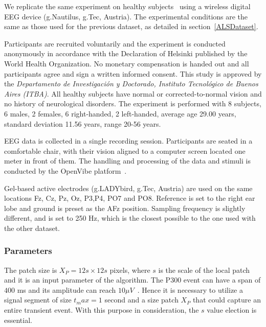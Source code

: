 \documentclass[utf8]{frontiersSCNS} %
\begin{document}
We replicate the same experiment on healthy subjects~\citep{owndataset} using a wireless digital EEG device (g.Nautilus, g.Tec, Austria).  The experimental conditions are the same as those used for the previous dataset, as detailed in section~\ref{ALSDataset}.

Participants are recruited voluntarily and the experiment is conducted anonymously in accordance with the Declaration of Helsinki published by the World Health Organization.  No monetary compensation is handed out and all participants agree and sign a written informed consent.  This study is approved by the \textit{Departamento de Investigación y Doctorado, Instituto Tecnológico de Buenos Aires (ITBA)}.  All healthy subjects have normal or corrected-to-normal vision and no history of neurological disorders. The experiment is performed with 8 subjects, 6 males, 2 females, 6 right-handed, 2 left-handed, average age 29.00 years, standard deviation  11.56 years, range 20-56 years.

EEG data is collected in a single recording session. Participants are seated in a comfortable chair, with their vision aligned to a computer screen located one meter in front of them.  The handling and processing of the data and stimuli is conducted by the OpenVibe platform~\citep{Renard2010}. 

Gel-based active electrodes (g.LADYbird, g.Tec, Austria) are used on the same locations Fz, Cz, Pz, Oz, P3,P4, PO7 and PO8.  Reference is set to the right ear lobe and ground is preset as the AFz position.   Sampling frequency is slightly different, and is set to 250 Hz, which is the closest possible to the one used with the other dataset.



\subsubsection{Parameters}

The patch size is $X_P = 12s \times 12s$ pixels, where $s$ is the scale of the local patch and it is an input parameter of the algorithm. The P300 event can have a span of $400$ ms and its amplitude can reach $ 10 \mu V $~\citep{Rao2013}.  Hence it is necessary to utilize a signal segment of size $t_max = 1$ second and a size patch $X_P$ that could capture an entire transient event. With this purpose in consideration, the $s$ value election is essential.
\end{document}
